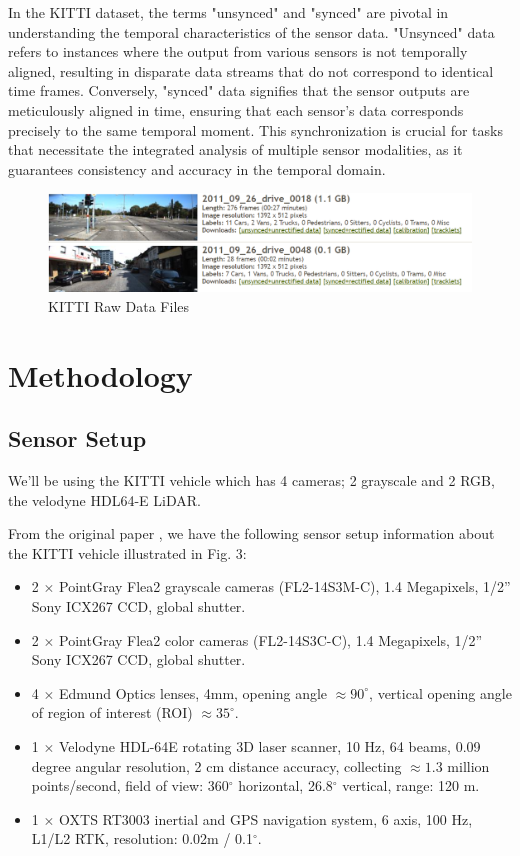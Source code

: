 \documentclass[letterpaper, 10 pt, conference]{ieeeconf}  %
\begin{document}
In the KITTI dataset, the terms "unsynced" and "synced" are pivotal in understanding the temporal characteristics of the sensor data. "Unsynced" data refers to instances where the output from various sensors is not temporally aligned, resulting in disparate data streams that do not correspond to identical time frames. Conversely, "synced" data signifies that the sensor outputs are meticulously aligned in time, ensuring that each sensor's data corresponds precisely to the same temporal moment. This synchronization is crucial for tasks that necessitate the integrated analysis of multiple sensor modalities, as it guarantees consistency and accuracy in the temporal domain.


\begin{figure}[htbp]
  \centering
  \includegraphics[width=\linewidth]{raw_data_KITTI.png}
  \caption{KITTI Raw Data Files}
  \label{KITTI Raw Data}
\end{figure}


\section{Methodology}

\subsection{Sensor Setup}

We'll be using the KITTI vehicle which has 4 cameras; 2 grayscale and 2 RGB, the velodyne HDL64-E LiDAR.

From the original paper \cite{KITTI} , we have the following sensor setup information about the KITTI vehicle illustrated in Fig. 3:
\begin{itemize}
  \item 2 $\times$ PointGray Flea2 grayscale cameras (FL2-14S3M-C), 1.4 Megapixels, 1/2'' Sony ICX267 CCD, global shutter.
  \item 2 $\times$ PointGray Flea2 color cameras (FL2-14S3C-C), 1.4 Megapixels, 1/2'' Sony ICX267 CCD, global shutter.
  \item 4 $\times$ Edmund Optics lenses, 4mm, opening angle $\approx 90^\circ$, vertical opening angle of region of interest (ROI) $\approx 35^\circ$.
  \item 1 $\times$ Velodyne HDL-64E rotating 3D laser scanner, 10 Hz, 64 beams, 0.09 degree angular resolution, 2 cm distance accuracy, collecting $\approx 1.3$ million points/second, field of view: 360$^\circ$ horizontal, 26.8$^\circ$ vertical, range: 120 m.
  \item 1 $\times$ OXTS RT3003 inertial and GPS navigation system, 6 axis, 100 Hz, L1/L2 RTK, resolution: 0.02m / 0.1$^\circ$.
\end{itemize}
\end{document}
